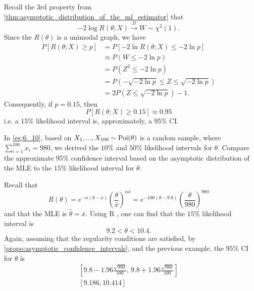 \documentclass[notoc,notitlepage]{tufte-book}
\newcommand{\convd}{\overset{D}{\to}}
\begin{document}
\begin{note}
  Recall the 3rd property from \cref{thm:asymptotic_distribution_of_the_ml_estimator} that
  \begin{equation*}
    -2 \log R(\theta; X) \convd W \sim \chi^2(1).
  \end{equation*}
  Since the $R(\theta)$ is a unimodal graph, we have
  \begin{align*}
    P[ R(\theta; X) \geq p ] &= P[ - 2 \ln R(\theta; X) \leq -2 \ln p ] \\
                             &\approx P(W \leq - 2 \ln p) \\
                             &= P(Z^2 \leq -2 \ln p) \\
                             &= P\left( - \sqrt{-2 \ln p} \leq Z \leq \sqrt{-2 \ln p} \right) \\
                             &= 2P\left(Z \leq \sqrt{-2 \ln p}\right) - 1.
  \end{align*}
  Consequently, if $p = 0.15$, then
  \begin{equation*}
    P[R(\theta; X) \geq 0.15] \approx 0.95
  \end{equation*}
  i.e. a $15\%$ likelihood interval is, approximately, a $95\%$ CI.
\end{note}

\begin{eg}[Example 6.24]
  In \cref{eg:6_10}, based on $X_1, ..., X_{100} \sim \operatorname{Poi}(\theta)$ is a random sample, where $\sum_{i=1}^{100} x_i = 980$, we derived the $10\%$ and $50\%$ likelihood intervals for $\theta$. Compare the approximate $95\%$ confidence interval based on the asymptotic distribution of the MLE to the $15\%$ likelihood interval for $\theta$.
\end{eg}

\begin{solution}
  Recall that
  \begin{equation*}
    R(\theta) = e^{-n ( \theta - \bar{x} )} \left( \frac{\theta}{\bar{x}} \right)^{n \bar{x}} = e^{-100 ( \theta - 9.8 )} \left( \frac{\theta}{980} \right)^{980}
  \end{equation*}
  and that the MLE is $\hat{\theta} = \bar{x}$. Using R , one can find that the $15\%$ likelihood interval is
  \begin{equation*}
    9.2 < \theta < 10.4.
  \end{equation*}
  Again, assuming that the regularity conditions are satisfied, by \cref{propo:asymptotic_confidence_intervals}, and the previous example, the $95\%$ CI for $\theta$ is
  \begin{gather*}
    \left[ 9.8 - 1.96 \frac{\sqrt{980}}{100} , \, 9.8 + 1.96 \frac{\sqrt{980}}{100} \right] \\
    [ 9.186, 10.414 ]
  \end{gather*}
\end{solution}
\end{document}

